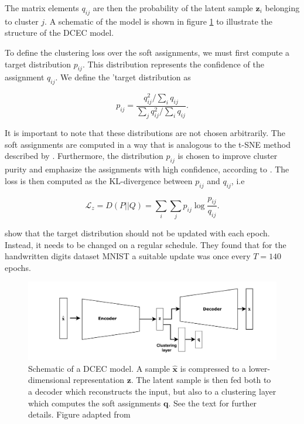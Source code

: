 \noindent The matrix elements $q_{ij}$ are then the probability of the latent sample $\boldsymbol{z}_i$ belonging to cluster $j$. A schematic of the model is shown in figure \ref{fig:dcec} to illustrate the structure of the DCEC model. 

To define the clustering loss over the soft assignments, we must first compute a target distribution $p_{ij}$. This distribution represents the confidence of the assignment $q_{ij}$. We define the 'target distribution as 

\begin{equation}
p_{ij} = \frac{q_{ij}^2/\sum_i q_{ij}}{\sum_j q_{ij}^2/\sum_i q_{ij}}.
\end{equation}

\noindent It is important to note that these distributions are not chosen arbitrarily. The soft assignments are computed in a way that is analogous to the t-SNE method described by \citet{VanDerMaaten2008}. Furthermore, the distribution $p_{ij}$ is chosen to improve cluster purity and emphasize the assignments with high confidence, according to \cite{Xie2016}. The loss is then computed as the KL-divergence between $p_{ij}$ and $q_{ij}$, i.e

\begin{equation}
\mathcal{L}_z = D(P ||Q ) = \sum_i \sum_j p_{ij} \log \frac{p_{ij}}{q_{ij}}.
\end{equation} 

\noindent \citet{Guo2017} show that the target distribution should not be updated with each epoch. Instead, it needs to be changed on a regular schedule. They found that for the handwritten digits dataset MNIST a suitable update was once every $T=140$ epochs. 

\begin{figure}[tb]
	\centering
	\includegraphics[width=\textwidth]{plots/dcec.pdf}
	\caption[Deep convolutional embedded clustering schematic]{Schematic of a DCEC model. A sample $\hat{\boldsymbol{x}}$ is compressed to a lower-dimensional representation $\boldsymbol{z}$. The latent sample is then fed both to a decoder which reconstructs the input, but also to a clustering layer which computes the soft assignments $\boldsymbol{q}$. See the text for further details. Figure adapted from \citet{Guo2017}}
	\label{fig:dcec}
\end{figure}

